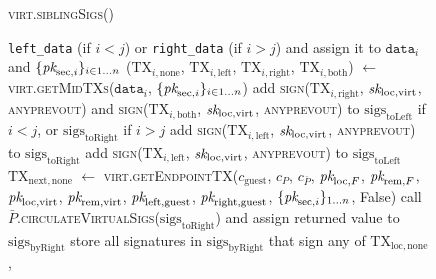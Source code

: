 \begin{figure}[H]
\begin{processbox}{\textsc{virt.siblingSigs}()}
\begin{algorithmic}[1]
        \texttt{left\_data} (if $i < j$) or \texttt{right\_data} (if $i > j$)
        and assign it to $\texttt{data}_i$ and $\{\textit{pk}_{\mathrm{sec}, i}\}_{i \in
        1 \dots n}$ 
        \State ($\mathrm{TX}_{i, \mathrm{none}}$, $\mathrm{TX}_{i,
        \mathrm{left}}$, $\mathrm{TX}_{i, \mathrm{right}}$, $\mathrm{TX}_{i,
        \mathrm{both}}$) $\gets$ \textsc{virt.getMidTXs}($\texttt{data}_i$,
        $\{\textit{pk}_{\mathrm{sec}, i}\}_{i \in 1 \dots n}$)
        \State add \textsc{sign}($\mathrm{TX}_{i, \mathrm{right}}$,
        $\textit{sk}_{\mathrm{loc}, \mathrm{virt}}$, \textsc{anyprevout}) and
        \textsc{sign}($\mathrm{TX}_{i, \mathrm{both}}$, $\textit{sk}_{\mathrm{loc},
        \mathrm{virt}}$, \textsc{anyprevout}) to
        $\mathrm{sigs}_{\mathrm{toLeft}}$ if $i < j$, or
        $\mathrm{sigs}_{\mathrm{toRight}}$ if $i > j$ 
         
          \State add \textsc{sign}($\mathrm{TX}_{i, \mathrm{left}}$,
          $\textit{sk}_{\mathrm{loc}, \mathrm{virt}}$, \textsc{anyprevout}) to
          $\mathrm{sigs}_{\mathrm{toRight}}$
         
          \State add \textsc{sign}($\mathrm{TX}_{i, \mathrm{left}}$,
          $\textit{sk}_{\mathrm{loc}, \mathrm{virt}}$, \textsc{anyprevout}) to
          $\mathrm{sigs}_{\mathrm{toLeft}}$
        \EndIf
      \EndFor
        \State $\mathrm{TX}_{\mathrm{next}, \mathrm{none}}$ $\gets$
        \textsc{virt.getEndpointTX}($c_{\mathrm{guest}}$, $c_P$, $c_{\bar{P}}$,
        $\textit{pk}_{\mathrm{loc}, F}$, $\textit{pk}_{\mathrm{rem}, F}$, $\textit{pk}_{\mathrm{loc},
        \mathrm{virt}}$, $\textit{pk}_{\mathrm{rem}, \mathrm{virt}}$, $\textit{pk}_{\mathrm{left},
        \mathrm{guest}}$, $\textit{pk}_{\mathrm{right}, \mathrm{guest}}$,
        $\{\textit{pk}_{\mathrm{sec}, i}\}_{1 \dots n}$, False)
      \EndIf
      \State call
      $\bar{P}$.\textsc{circulateVirtualSigs}($\mathrm{sigs}_{\mathrm{toRight}}$)
      and assign returned value to $\mathrm{sigs}_{\mathrm{byRight}}$
      \State store all signatures in $\mathrm{sigs}_{\mathrm{byRight}}$ that
      sign any of $\mathrm{TX}_{\mathrm{loc}, \mathrm{none}}$,

\end{algorithmic}
\end{processbox}
\end{figure}
